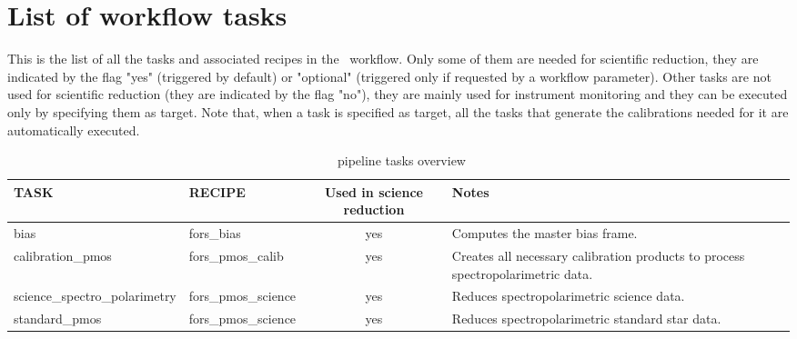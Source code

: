 \section{List of workflow tasks}

This is the list of all the tasks and associated recipes in the
\instname\ workflow.  Only some of them are needed for scientific
reduction, they are indicated by the flag "yes" (triggered by default)
or "optional" (triggered only if requested by a workflow
parameter). Other tasks are not used for scientific reduction (they
are indicated by the flag "no"), they are mainly used for instrument
monitoring and they can be executed only by specifying them as
target. Note that, when a task is specified as target, all the tasks
that generate the calibrations needed for it are automatically
executed.

\begin{table}[htbp]
\centering
\scriptsize
\begin{tabular}{|l|l|c|p{7cm}|}
\hline
\textbf{TASK} & \textbf{RECIPE} & \textbf{Used in science reduction} & \textbf{Notes} \\
\hline 
bias                              & fors\_bias          & yes      & Computes the master bias frame.       \\
calibration\_pmos                  & fors\_pmos\_calib    & yes       & Creates all necessary calibration products to process spectropolarimetric data.          \\
science\_spectro\_polarimetry       & fors\_pmos\_science  & yes & Reduces spectropolarimetric science data.         \\
standard\_pmos       & fors\_pmos\_science  & yes & Reduces spectropolarimetric standard star data.         \\
\hline
\end{tabular}
\caption{\instname\ pipeline tasks overview}
\end{table}
